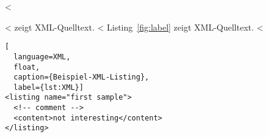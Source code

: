 <%

\begin{WSample}
<%
 zeigt XML-Quelltext.
<%
Listing~\ref{fig:label} zeigt XML-Quelltext.
<%

\begin{lstlisting}[
  language=XML,
  float,
  caption={Beispiel-XML-Listing},
  label={lst:XML}]
<listing name="first sample">
  <!-- comment -->
  <content>not interesting</content>
</listing>
\end{lstlisting}
\end{WSample}
\PexaShowBoth{}
